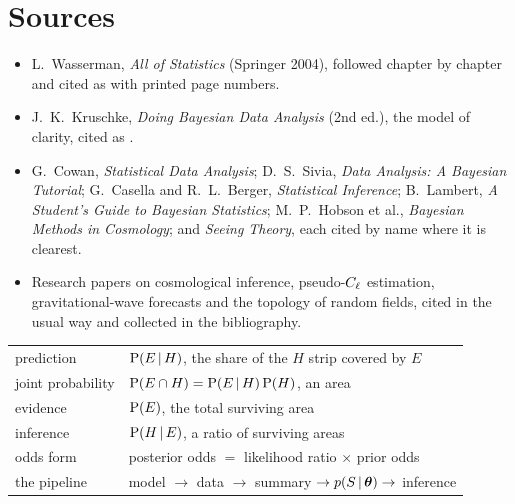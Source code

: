 \section*{Sources}
\begin{itemize}
  \item L.~Wasserman, \emph{All of Statistics} (Springer 2004), followed
        chapter by chapter and cited as  with printed page
        numbers.
  \item J.~K.~Kruschke, \emph{Doing Bayesian Data Analysis} (2nd ed.), the
        model of clarity, cited as .
  \item G.~Cowan, \emph{Statistical Data Analysis}; D.~S.~Sivia,
        \emph{Data Analysis: A Bayesian Tutorial}; G.~Casella and
        R.~L.~Berger, \emph{Statistical Inference}; B.~Lambert, \emph{A
        Student's Guide to Bayesian Statistics}; M.~P.~Hobson et al.,
        \emph{Bayesian Methods in Cosmology}; and \emph{Seeing Theory}, each
        cited by name where it is clearest.
  \item Research papers on cosmological inference, pseudo-$C_\ell$ estimation,
        gravitational-wave forecasts and the topology of random fields, cited
        in the usual way and collected in the bibliography.
\end{itemize}

\begin{recap}
\begin{tabular}{@{}ll@{}}
  prediction & $\operatorname{P}(E\,\vert\, H)$, the share of the $H$ strip covered by $E$\\
  joint probability & $\operatorname{P}(E\cap H)=\operatorname{P}(E\,\vert\, H)\operatorname{P}(H)$, an area\\
  evidence & $\operatorname{P}(E)$, the total surviving area\\
  inference & $\operatorname{P}(H\,\vert\, E)$, a ratio of surviving areas\\
  odds form & posterior odds $=$ likelihood ratio $\times$ prior odds\\
  the pipeline & model $\to$ data $\to$ summary $\to p(S\,\vert\,\bm{\theta})\to$ inference\\
\end{tabular}

\smallskip{}
\end{recap}

\renewcommand{\thefigure}{\thechapter.\arabic{figure}}
\renewcommand{\thewdef}{\thechapter.\arabic{wdef}}
\renewcommand{\thewex}{\thechapter.\arabic{wex}}
\renewcommand{\thelstlisting}{\thechapter.\arabic{lstlisting}}
